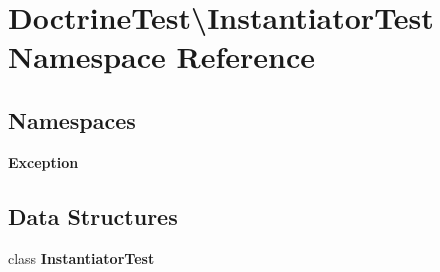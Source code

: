 \section{Doctrine\+Test\textbackslash{}Instantiator\+Test Namespace Reference}
\label{namespace_doctrine_test_1_1_instantiator_test}
\subsection*{Namespaces}
\begin{DoxyCompactItemize}
\item 
 {\bf Exception}
\end{DoxyCompactItemize}
\subsection*{Data Structures}
\begin{DoxyCompactItemize}
\item 
class {\bf Instantiator\+Test}
\end{DoxyCompactItemize}
